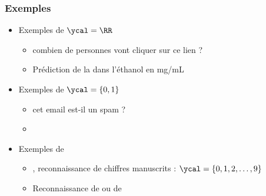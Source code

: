 \begin{frame}
  \frametitle{Exemples}
  \begin{itemize}
  \item Exemples de   $\ycal = \RR$ 
    \begin{itemize}
    \item {} combien de personnes vont cliquer sur ce lien ?
    \item Prédiction de la  dans l'éthanol en mg/mL
    \end{itemize}
  \pause
  \item Exemples de   $\ycal = \{0, 1\}$
    \begin{itemize}
    \item {} cet email est-il un spam ?
    \item {} 
    \end{itemize}
  \pause
  \item Exemples de   
    \begin{itemize}
    \item {}, reconnaissance de chiffres manuscrits : $\ycal = \{0, 1, 2, \dots, 9\}$
    \item Reconnaissance de  ou de 
    \end{itemize} 
  \end{itemize}
\end{frame}

